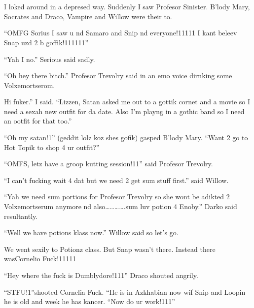 \section{\chaptername~\thesection}


\XXX{\Xfill 666\Xfill}

I loked around in a depresed way. Suddenly I saw Profesor Sinister. B'lody Mary, Socrates and Draco, Vampire and Willow were their to.

\enquote{OMFG Sorius I saw u nd Samaro and Snip nd everyone!11111 I kant beleev Snap uzd 2 b goffik!111111}

\enquote{Yah I no.} Serious said sadly.

\enquote{Oh hey there bitch.} Profesor Trevolry said in an emo voice dirnking some Volxemortserom.

Hi fuker.'' I said. \enquote{Lizzen, Satan asked me out to a gottik cornet and a movie so I need a sexah new outfit for da date. Also I'm playng in a gothic band so I need an ootfit for that too.}

\enquote{Oh my satan!1} (geddit lolz koz shes gofik) gasped B'lody Mary. \enquote{Want 2 go to Hot Topik to shop 4 ur outfit?}

\begin{sloppypar}
    \enquote{OMFS, letz have a groop kutting session!11} said Profesor Trevolry.    
\end{sloppypar}

\enquote{I can't fucking wait 4 dat but we need 2 get sum stuff first.} said Willow.

\enquote{Yah we need sum portions for Profesor Trevolry so she wont be adikted 2 Volxemortserum anymore nd also………….sum luv potion 4 Enoby.} Darko said resultantly.

\enquote{Well we have potions klass now.} Willow said so let's go.

We went sexily to Potionz class. But Snap wasn't there. Instead there was\dotfill Cornelio Fuck!11111

\enquote{Hey where the fuck is Dumblydore!111} Draco shouted angrily.

\enquote{STFU\@!\@1\@}\@ shooted Cornelia Fuck. ``He is in Azkhabian now wif Snip and Loopin he is old and week he has kancer. \enquote{Now do ur work!111}

